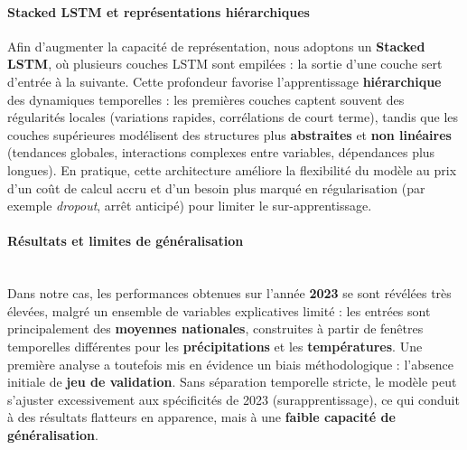 \documentclass{article}
\theoremstyle{nopointbreak}
\theoremstyle{nobrkbold}
\begin{document}
\paragraph{Stacked LSTM et représentations hiérarchiques}
Afin d’augmenter la capacité de représentation, nous adoptons un \textbf{Stacked LSTM}, où plusieurs couches LSTM sont empilées : la sortie d’une couche sert d’entrée à la suivante. Cette profondeur favorise l’apprentissage \textbf{hiérarchique} des dynamiques temporelles : les premières couches captent souvent des régularités locales (variations rapides, corrélations de court terme), tandis que les couches supérieures modélisent des structures plus \textbf{abstraites} et \textbf{non linéaires} (tendances globales, interactions complexes entre variables, dépendances plus longues). En pratique, cette architecture améliore la flexibilité du modèle au prix d’un coût de calcul accru et d’un besoin plus marqué en régularisation (par exemple \emph{dropout}, arrêt anticipé) pour limiter le sur-apprentissage.


\paragraph{Résultats et limites de généralisation} \\
Dans notre cas, les performances obtenues sur l'année \textbf{2023} se sont révélées très élevées, malgré un ensemble de variables explicatives limité : les entrées sont principalement des \textbf{moyennes nationales}, construites à partir de fenêtres temporelles différentes pour les \textbf{précipitations} et les \textbf{températures}. Une première analyse a toutefois mis en évidence un biais méthodologique : l'absence initiale de \textbf{jeu de validation}. Sans séparation temporelle stricte, le modèle peut s'ajuster excessivement aux spécificités de 2023 (surapprentissage), ce qui conduit à des résultats flatteurs en apparence, mais à une \textbf{faible capacité de généralisation}. \\
[METTRE LES GRAPHIQUES]
\end{document}
